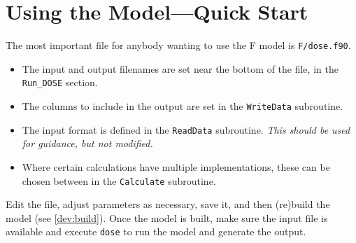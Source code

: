 


\section{Using the Model---Quick Start}

The most important file for anybody wanting to use the \DOSE{} F model is \verb|F/dose.f90|.

\begin{itemize}

\item The input and output filenames are set near the bottom of the file, in the \verb|Run_DOSE| 
section.

\item The columns to include in the output are set in the \verb|WriteData| subroutine.

\item The input format is defined in the \verb|ReadData| subroutine.  \emph{This should be used for 
guidance, but not modified.}

\item Where certain calculations have multiple implementations, these can be chosen between in the 
\verb|Calculate| subroutine.

\end{itemize}

Edit the file, adjust parameters as necessary, save it, and then (re)build the model (see 
\ref{dev:build}).  Once the model is built, make sure the input file is available and execute 
\verb|dose| to run the model and generate the output.




